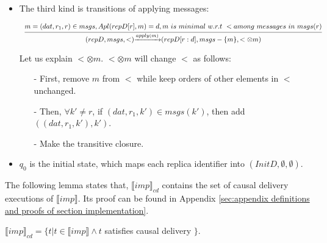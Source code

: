 \begin {itemize}
\begin{itemize}
    \item[-] Make the transitive closure.
    \end{itemize}

\item[-] The third kind is transitions of applying messages:

    $\begin{array}{l c} \bigfrac{ m = (dat,r_1,r) \in msgs,Apl(repD[r],m) = d, m \ is \ minimal \ w.r.t \ < among \ messages \ in \ msgs(r) } {(repD,msgs,<) {\xrightarrow{apply(m)}} (repD[r:d],msgs - \{ m \}, < \otimes m )} \end{array}$

    Let us explain $< \otimes m$. $< \otimes m$ will change $<$ as follows:

    \begin{itemize}
    \setlength{\itemsep}{0.5pt}
    \item[-] First, remove $m$ from $<$ while keep orders of other elements in $<$ unchanged.

    \item[-] Then, $\forall k' \neq r$, if $(dat,r_1,k') \in msgs(k')$, then add $((dat,r_1,k'),k')$.

    \item[-] Make the transitive closure.
    \end{itemize}

\item[-] $q_0$ is the initial state, which maps each replica identifier into $(InitD,\emptyset,\emptyset)$.
\end{itemize}

The following lemma states that, $\llbracket imp \rrbracket_{cd}$ contains the set of causal delivery executions of $\llbracket imp \rrbracket$. Its proof can be found in Appendix \ref{sec:appendix definitions and proofs of section implementation}.

\begin{lemma}
\label{lemma:semantics of imp cd contains the set of causal delivery executions of semantics of imp}

$\llbracket imp \rrbracket_{cd} = \{ t \vert t \in \llbracket imp \rrbracket \wedge t$ satisfies causal delivery $\}$.
\end{lemma}


